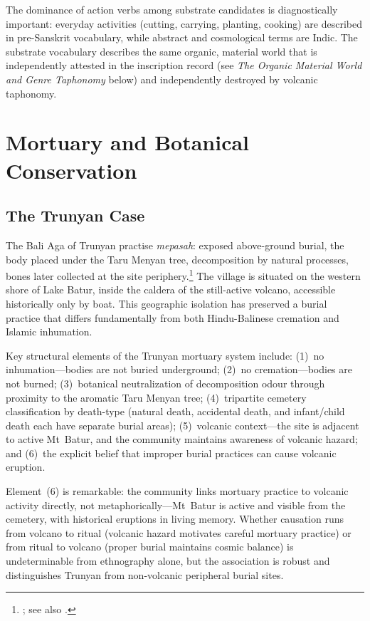\documentclass[12pt,a4paper]{article}
\begin{document}
The dominance of action verbs among substrate candidates is diagnostically important: everyday activities (cutting, carrying, planting, cooking) are described in pre-Sanskrit vocabulary, while abstract and cosmological terms are Indic. The substrate vocabulary describes the same organic, material world that is independently attested in the inscription record (see \emph{The Organic Material World and Genre Taphonomy} below) and independently destroyed by volcanic taphonomy.

\section{Mortuary and Botanical Conservation}
\label{sec:mortuary}

\subsection{The Trunyan Case}

The Bali Aga of Trunyan practise \emph{mepasah}: exposed above-ground burial, the body placed under the Taru Menyan tree, decomposition by natural processes, bones later collected at the site periphery.\footnote{\autocite{danandjaja1980kebudayaan}; see also \autocite{astiti2005trunyan}.} The village is situated on the western shore of Lake Batur, inside the caldera of the still-active volcano, accessible historically only by boat. This geographic isolation has preserved a burial practice that differs fundamentally from both Hindu-Balinese cremation and Islamic inhumation.

Key structural elements of the Trunyan mortuary system include: (1)~no inhumation---bodies are not buried underground; (2)~no cremation---bodies are not burned; (3)~botanical neutralization of decomposition odour through proximity to the aromatic Taru Menyan tree; (4)~tripartite cemetery classification by death-type (natural death, accidental death, and infant/child death each have separate burial areas); (5)~volcanic context---the site is adjacent to active Mt~Batur, and the community maintains awareness of volcanic hazard; and (6)~the explicit belief that improper burial practices can cause volcanic eruption.

Element~(6) is remarkable: the community links mortuary practice to volcanic activity directly, not metaphorically---Mt~Batur is active and visible from the cemetery, with historical eruptions in living memory. Whether causation runs from volcano to ritual (volcanic hazard motivates careful mortuary practice) or from ritual to volcano (proper burial maintains cosmic balance) is undeterminable from ethnography alone, but the association is robust and distinguishes Trunyan from non-volcanic peripheral burial sites.
\end{document}
